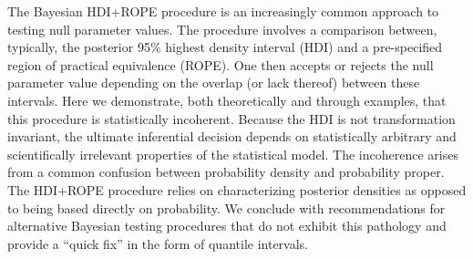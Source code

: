 The Bayesian HDI+ROPE procedure is an increasingly common approach to testing null parameter values.
The procedure involves a comparison between, typically, the posterior 95\% highest density interval (HDI) and a pre-specified region of practical equivalence (ROPE). One then accepts or rejects the null parameter value depending on the overlap (or lack thereof) between these intervals.
Here we demonstrate, both theoretically and through examples, that this procedure is statistically incoherent.
%
Because the HDI is not transformation invariant, the ultimate inferential decision depends on statistically arbitrary and scientifically irrelevant properties of the statistical model.
The incoherence arises from a common confusion between probability density and probability proper.  The HDI+ROPE procedure relies on characterizing posterior densities as opposed to being based directly on probability. 
We conclude with recommendations for alternative Bayesian testing procedures that do not exhibit this pathology and provide a ``quick fix'' in the form of quantile intervals.